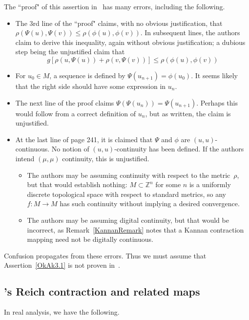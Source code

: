 \documentclass{article}
\numberwithin{thm}{section}
\def\Z{{\mathbb Z}}
\begin{document}
The ``proof" of this assertion in~\cite{OkAk} has many errors, including
the following.
\begin{itemize}
    \item The 3rd line of the ``proof" claims, with no obvious
    justification, that $\rho(\Psi(u),\Psi(v)) \le \rho(\phi(u), \phi(v))$.
    In subsequent lines, the authors claim to derive this inequality,
    again without obvious justification; a dubious step being the
    unjustified claim that
    \[ g[\rho(u, \Psi(u)) + \rho(v, \Psi(v))] \le
    \rho(\phi(u),\phi(v))
    \]
    \item For $u_0 \in M$, a sequence is defined by
          $\Psi(u_{n+1}) = \phi(u_0)$. It seems likely that the right
          side should have some expression in $u_n$.
    \item The next line of the proof claims $\Psi(\Psi(u_n))=\Psi(u_{n+1})$.
          Perhaps this would follow from a correct definition of
          $u_n$, but as written, the claim is unjustified.
    \item At the last line of page 241, it is claimed that $\Psi$ and
    $\phi$ are $(u,u)$-continuous. No notion of $(u,u)$-continuity has
    been defined. If the authors intend $(\mu,\mu)$ continuity, this is
    unjustified. 
    \begin{itemize}
        \item The authors may be assuming continuity with respect to
              the metric~$\rho$, but that would establish nothing:
              $M \subset \Z^n$ for some $n$ is a uniformly discrete
              topological space with respect to standard metrics, so
              any $f: M \to M$ has such continuity without implying
              a desired convergence.
        \item The authors may be assuming digital continuity, but that
              would be incorrect, as 
              Remark~\ref{KannanRemark}
              notes that a Kannan contraction mapping need not be
              digitally continuous.
    \end{itemize}
\end{itemize}
Confusion propagates from these errors. Thus we must assume that
Assertion~\ref{OkAk3.1} is not proven in~\cite{OkAk}.


\subsection{\cite{OkAk}'s Reich contraction and related maps}
In real analysis, we have
the following.
\end{document}
